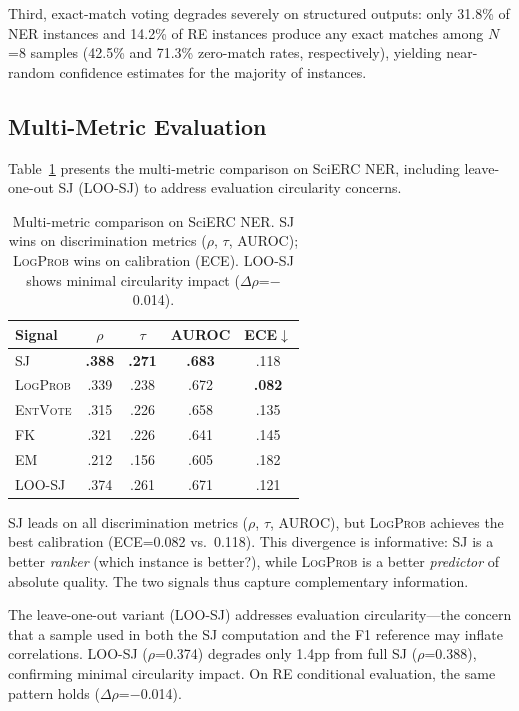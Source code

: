 \documentclass[11pt,a4paper]{article}
\newcommand{\SJ}{\textsc{SJ}}
\newcommand{\FK}{\textsc{FK}}
\newcommand{\LP}{\textsc{LogProb}}
\newcommand{\EM}{\textsc{EM}}
\newcommand{\EV}{\textsc{EntVote}}
\begin{document}
Third, exact-match voting degrades severely on structured outputs: only 31.8\% of NER instances and 14.2\% of RE instances produce any exact matches among $N$=8 samples (42.5\% and 71.3\% zero-match rates, respectively), yielding near-random confidence estimates for the majority of instances.

\subsection{Multi-Metric Evaluation}
\label{sec:multi-metric}

Table~\ref{tab:multimetric} presents the multi-metric comparison on SciERC NER, including leave-one-out SJ (LOO-\SJ{}) to address evaluation circularity concerns.

\begin{table}[t]
\centering
\small
\begin{tabular}{l cccc}
\toprule
\textbf{Signal} & $\rho$ & $\tau$ & AUROC & ECE$\downarrow$ \\
\midrule
\SJ{} & \textbf{.388} & \textbf{.271} & \textbf{.683} & .118 \\
\LP{} & .339 & .238 & .672 & \textbf{.082} \\
\EV{} & .315 & .226 & .658 & .135 \\
\FK{} & .321 & .226 & .641 & .145 \\
\EM{} & .212 & .156 & .605 & .182 \\
LOO-\SJ{} & .374 & .261 & .671 & .121 \\
\bottomrule
\end{tabular}
\caption{Multi-metric comparison on SciERC NER. \SJ{} wins on discrimination metrics ($\rho$, $\tau$, AUROC); \LP{} wins on calibration (ECE). LOO-\SJ{} shows minimal circularity impact ($\Delta\rho$=$-$0.014).}
\label{tab:multimetric}
\end{table}

\SJ{} leads on all discrimination metrics ($\rho$, $\tau$, AUROC), but \LP{} achieves the best calibration (ECE=0.082 vs.\ 0.118).
This divergence is informative: \SJ{} is a better \emph{ranker} (which instance is better?), while \LP{} is a better \emph{predictor} of absolute quality.
The two signals thus capture complementary information.

The leave-one-out variant (LOO-\SJ{}) addresses evaluation circularity---the concern that a sample used in both the \SJ{} computation and the F1 reference may inflate correlations.
LOO-\SJ{} ($\rho$=0.374) degrades only 1.4pp from full \SJ{} ($\rho$=0.388), confirming minimal circularity impact.
On RE conditional evaluation, the same pattern holds ($\Delta\rho$=$-$0.014).
\end{document}
